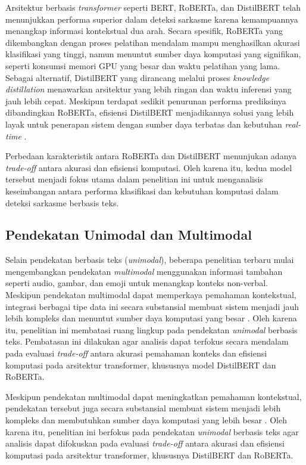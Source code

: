 Arsitektur berbasis \textit{transformer} seperti BERT, RoBERTa, dan DistilBERT telah menunjukkan performa superior dalam deteksi sarkasme karena kemampuannya menangkap informasi kontekstual dua arah. Secara spesifik, RoBERTa yang dikembangkan dengan proses pelatihan mendalam mampu menghasilkan akurasi klasifikasi yang tinggi, namun menuntut sumber daya komputasi yang signifikan, seperti konsumsi memori GPU yang besar dan waktu pelatihan yang lama. Sebagai alternatif, DistilBERT yang dirancang melalui proses \textit{knowledge distillation} menawarkan arsitektur yang lebih ringan dan waktu inferensi yang jauh lebih cepat. Meskipun terdapat sedikit penurunan performa prediksinya dibandingkan RoBERTa, efisiensi DistilBERT menjadikannya solusi yang lebih layak untuk penerapan sistem dengan sumber daya terbatas dan kebutuhan \textit{real-time} \cite{dubey2025unpacking}.

Perbedaan karakteristik antara RoBERTa dan DistilBERT menunjukan adanya \textit{trade-off} antara akurasi dan efisiensi komputasi. Oleh karena itu, kedua model tersebut menjadi fokus utama dalam penelitian ini untuk menganalisis keseimbangan antara performa klasifikasi dan kebutuhan komputasi dalam deteksi sarkasme berbasis teks.

\subsection{Pendekatan Unimodal dan Multimodal}

Selain pendekatan berbasis teks (\textit{unimodal}), beberapa penelitian terbaru mulai mengembangkan pendekatan \textit{multimodal} menggunakan informasi tambahan seperti audio, gambar, dan emoji untuk menangkap konteks non-verbal. Meskipun pendekatan multimodal dapat memperkaya pemahaman kontekstual, integrasi berbagai tipe data ini secara substansial membuat sistem menjadi jauh lebih kompleks dan menuntut sumber daya komputasi yang besar \cite{dhumpati2025sarcasm}. Oleh karena itu, penelitian ini membatasi ruang lingkup pada pendekatan \textit{unimodal} berbasis teks. Pembatasan ini dilakukan agar analisis dapat terfokus secara mendalam pada evaluasi \textit{trade-off} antara akurasi pemahaman konteks dan efisiensi komputasi pada arsitektur transformer, khususnya model DistilBERT dan RoBERTa.

Meskipun pendekatan multimodal dapat meningkatkan pemahaman kontekstual, pendekatan tersebut juga secara substansial membuat sistem menjadi lebih kompleks dan membutuhkan sumber daya komputasi yang lebih besar \cite{dhumpati2025sarcasm}. Oleh karena itu, penelitian ini berfokus pada pendekatan \textit{unimodal} berbasis teks agar analisis dapat difokuskan pada evaluasi \textit{trade-off} antara akurasi dan efisiensi komputasi pada arsitektur transformer, khususnya DistilBERT dan RoBERTa. 

